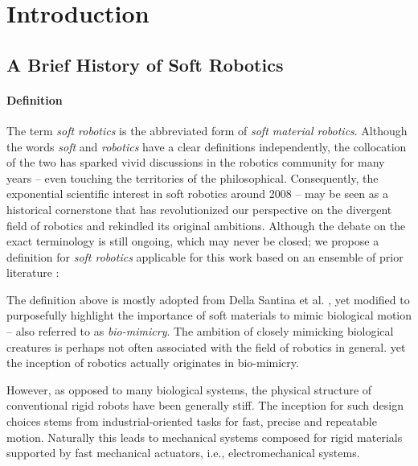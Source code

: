 \chapter{Introduction}
\label{chap: intro}
\setcounter{page}{1}


\vspace*{-2mm}
\section{A Brief History of Soft Robotics}
\label{sec: chap1 motivation}

\subsubsection{Definition}

The term \emph{soft robotics} is the abbreviated form of \emph{soft material robotics}. Although the words \emph{soft} and \emph{robotics} have a clear definitions independently, the collocation of the two has sparked vivid discussions in the robotics community for many years -- even touching the territories of the philosophical. Consequently, the exponential scientific interest in soft robotics around 2008 -- may be seen as a historical cornerstone that has revolutionized our perspective on the divergent field of robotics and rekindled its original ambitions. Although the debate on the exact terminology is still ongoing, which may never be closed; we propose a definition for \emph{soft robotics} applicable for this work based on an ensemble of prior literature :


The definition above is mostly adopted from Della Santina et al. \cite{}, yet modified to purposefully highlight the importance of soft materials to mimic biological motion -- also referred to as \emph{bio-mimicry}. The ambition of closely mimicking biological creatures is perhaps not often associated with the field of robotics in general. yet the inception of robotics actually originates in bio-mimicry.

However, as opposed to many biological systems, the physical structure of conventional rigid robots have been generally stiff. The inception for such design choices stems from industrial-oriented tasks for fast, precise and repeatable motion. Naturally this leads to mechanical systems composed for rigid materials supported by fast mechanical actuators, i.e., electromechanical systems.

